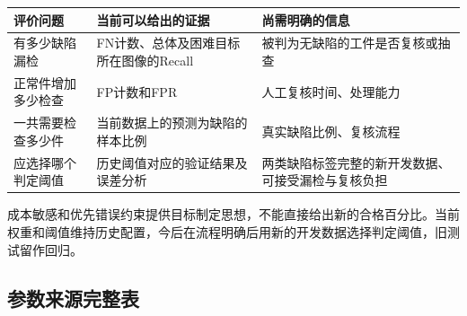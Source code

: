 \par\medskip\noindent\begin{minipage}{\linewidth}\small{}
\begin{tabular}{@{}>{\raggedright\arraybackslash}p{0.240\dimexpr\linewidth-4\tabcolsep\relax}>{\raggedright\arraybackslash}p{0.340\dimexpr\linewidth-4\tabcolsep\relax}>{\raggedright\arraybackslash}p{0.420\dimexpr\linewidth-4\tabcolsep\relax}@{}}
\toprule
评价问题 & 当前可以给出的证据 & 尚需明确的信息 \\
\midrule
有多少缺陷漏检 & FN计数、总体及困难目标所在图像的Recall & 被判为无缺陷的工件是否复核或抽查 \\
正常件增加多少检查 & FP计数和FPR & 人工复核时间、处理能力 \\
一共需要检查多少件 & 当前数据上的预测为缺陷的样本比例 & 真实缺陷比例、复核流程 \\
应选择哪个判定阈值 & 历史阈值对应的验证结果及误差分析 & 两类缺陷标签完整的新开发数据、可接受漏检与复核负担 \\
\bottomrule\end{tabular}\end{minipage}\par\medskip

成本敏感和优先错误约束提供目标制定思想\cite{ref5}\cite{ref6}，不能直接给出新的合格百分比。当前权重和阈值维持历史配置，今后在流程明确后用新的开发数据选择判定阈值，旧测试留作回归。

\FloatBarrier{}\subsection{参数来源完整表}

